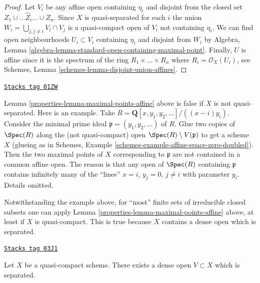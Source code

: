 \begin{proof}
Let $V_i$ be any affine open containing $\eta_i$
and disjoint from the closed set $Z_1 \cup \ldots \hat Z_i \ldots \cup Z_n$.
Since $X$ is quasi-separated for each $i$ the union
$W_i = \bigcup_{j, j \not = i} V_i \cap V_j$ is a quasi-compact
open of $V_i$ not containing $\eta_i$.
We can find open neighbourhoods $U_i \subset V_i$
containing $\eta_i$ and disjoint from $W_i$ by
Algebra, Lemma \ref{algebra-lemma-standard-open-containing-maximal-point}.
Finally, $U$ is affine since it is the spectrum of
the ring $R_1 \times \ldots \times R_n$ where $R_i = \mathcal{O}_X(U_i)$,
see Schemes, Lemma \ref{schemes-lemma-disjoint-union-affines}.
\end{proof}

\begin{remark}
\label{properties-remark-maximal-points-affine}
\href{https://stacks.math.columbia.edu/tag/01ZW}{\texttt{Stacks tag 01ZW}}

Lemma \ref{properties-lemma-maximal-points-affine} above is false if $X$
is not quasi-separated. Here is an example. Take
$R = \mathbf{Q}[x, y_1, y_2, \ldots]/((x-i)y_i)$.
Consider the minimal prime ideal $\mathfrak p = (y_1, y_2, \ldots)$
of $R$. Glue two copies of $\Spec(R)$ along the
(not quasi-compact) open $\Spec(R) \setminus V(\mathfrak p)$
to get a scheme $X$ (glueing as in
Schemes, Example \ref{schemes-example-affine-space-zero-doubled}).
Then the two maximal points of $X$ corresponding to $\mathfrak p$
are not contained in a common affine open. The reason is
that any open of $\Spec(R)$ containing $\mathfrak p$
contains infinitely many of the ``lines'' $x = i$, $y_j = 0$,
$j \not = i$ with parameter $y_i$. Details omitted.
\end{remark}

Notwithstanding the example above, for ``most'' finite sets of irreducible
closed subsets one can apply Lemma \ref{properties-lemma-maximal-points-affine} above,
at least if $X$ is quasi-compact. This is true because $X$ contains a dense
open which is separated.

\begin{lemma}
\label{properties-lemma-quasi-compact-dense-open-separated}
\href{https://stacks.math.columbia.edu/tag/03J1}{\texttt{Stacks tag 03J1}}

Let $X$ be a quasi-compact scheme.
There exists a dense open $V \subset X$ which is separated.
\end{lemma}

